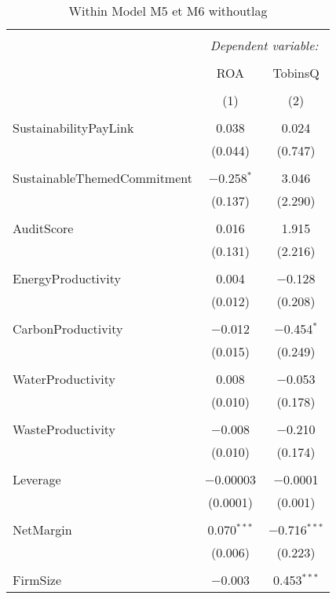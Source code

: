 \documentclass[]{article}
\begin{document}
\begin{table}[h] \centering 
  \caption{Within Model M5 et M6 withoutlag} 
  \label{Plm} 
\begin{tabular}{@{\extracolsep{5pt}}lcc} 
\\[-1.8ex]\hline 
\hline \\[-1.8ex] 
 & \multicolumn{2}{c}{\textit{Dependent variable:}} \\ 
\cline{2-3} 
\\[-1.8ex] & ROA & TobinsQ \\ 
\\[-1.8ex] & (1) & (2)\\ 
\hline \\[-1.8ex] 
 SustainabilityPayLink & 0.038 & 0.024 \\ 
  & (0.044) & (0.747) \\ 
  & & \\ 
 SustainableThemedCommitment & $-$0.258$^{*}$ & 3.046 \\ 
  & (0.137) & (2.290) \\ 
  & & \\ 
 AuditScore & 0.016 & 1.915 \\ 
  & (0.131) & (2.216) \\ 
  & & \\ 
 EnergyProductivity & 0.004 & $-$0.128 \\ 
  & (0.012) & (0.208) \\ 
  & & \\ 
 CarbonProductivity & $-$0.012 & $-$0.454$^{*}$ \\ 
  & (0.015) & (0.249) \\ 
  & & \\ 
 WaterProductivity & 0.008 & $-$0.053 \\ 
  & (0.010) & (0.178) \\ 
  & & \\ 
 WasteProductivity & $-$0.008 & $-$0.210 \\ 
  & (0.010) & (0.174) \\ 
  & & \\ 
 Leverage & $-$0.00003 & $-$0.0001 \\ 
  & (0.0001) & (0.001) \\ 
  & & \\ 
 NetMargin & 0.070$^{***}$ & $-$0.716$^{***}$ \\ 
  & (0.006) & (0.223) \\ 
  & & \\ 
 FirmSize & $-$0.003 & 0.453$^{***}$ \\ 

\end{tabular}
\end{table}
\end{document}

